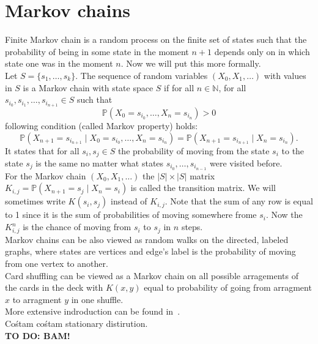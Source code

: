 \documentclass[a4paper, 12pt]{report}
\newcommand{\todo}[1]{\hfill \break \textbf{\Huge TO DO: #1 \hfill \break}\normalsize}
\begin{document}
\chapter{Markov chains}
\setcounter{page}{5}
Finite Markov chain is a random process on the finite set of states such that
the probability of being in some state in the moment $n+1$ depends only on in which state one was
in the moment $n$. Now we will put this more formally.\\
Let $S = \{s_1, \dots, s_k\}$. The sequence of random variables $(X_0, X_1, \dots)$ with values in $S$
is a Markov chain with state space $S$ if for all $n \in \mathbb{N}$,
for all $s_{i_0}, s_{i_1}, \dots, s_{i_{n+1}} \in S$ such that
\begin{equation*}
\mathbb{P}(X_0 = s_{i_0}, \dots, X_n = s_{i_n}) > 0
\end{equation*}
following condition (called Markov property) holds:
\begin{equation}
\mathbb{P}(X_{n+1} = s_{i_{n+1}} \mid X_0 = s_{i_0}, \dots, X_n = s_{i_n}) =
\mathbb{P}(X_{n+1} = s_{i_{n+1}} \mid X_n = s_{i_n}).
\end{equation}
It states that for all $s_i, s_j \in S$ the probability of moving from the state
$s_i$ to the state $s_j$ is the same no matter what states $s_{i_0}, \dots, s_{i_{n-1}}$
were visited before. \\
For the Markov chain $(X_0, X_1, \dots)$ the $|S| \times |S|$ matrix
$K_{i,j} = \mathbb{P}(X_{n+1} = s_j \mid X_n = s_i)$ is called the transition matrix. We will sometimes
write $K(s_i, s_j)$ instead of $K_{i,j}$. Note that the sum of
any row is equal to 1 since it is the sum of probabilities of moving somewhere frome $s_i$.
Now the $K^n_{i,j}$ is the chance of moving from $s_i$ to $s_j$ in $n$ steps. \\
Markov chains can be also viewed as random walks on the directed, labeled graphs, where states are vertices
and edge's label is the probability of moving from one vertex to another. \\
Card shuffling can be viewed as a Markov chain on all possible arragements of the cards
in the deck with $K(x,y)$ equal to probability of going from arragment $x$ to arragment $y$ in one shuffle. 
\\ More extensive indroduction can be found in~\cite{LePeWi}. \\
Cośtam cośtam stationary distirution. \\
\todo{BAM!}
\end{document}
